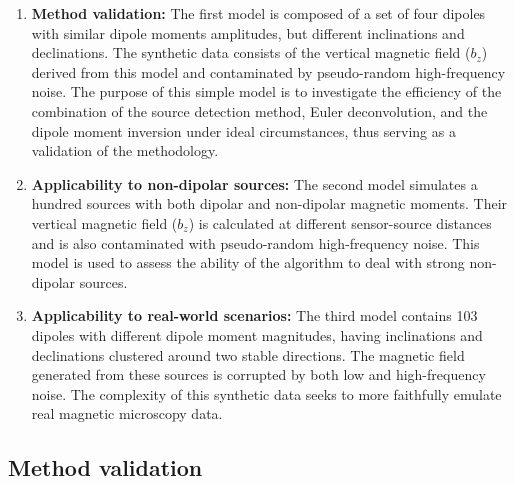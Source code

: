 \begin{enumerate}
\item \textbf{Method validation:} 
The first model is composed of a set of four dipoles with similar dipole moments amplitudes, but different inclinations and declinations.
The synthetic data consists of the vertical magnetic field ($b_z$) derived from this model and contaminated by pseudo-random high-frequency noise.
The purpose of this simple model is to investigate the efficiency of the combination of the source detection method, Euler deconvolution, and the dipole moment inversion under ideal circumstances, thus serving as a validation of the methodology.

\item \textbf{Applicability to non-dipolar sources:}
The second model simulates a hundred sources with both dipolar and non-dipolar magnetic moments.
Their vertical magnetic field ($b_z$) is calculated at different sensor-source distances
and is also contaminated with pseudo-random high-frequency noise. 
This model is used to assess the ability of the algorithm to deal with strong non-dipolar sources.

\item \textbf{Applicability to real-world scenarios:}
The third model contains 103 dipoles with different dipole moment magnitudes, having inclinations and declinations clustered around two stable directions.
The magnetic field generated from these sources is corrupted by both low and high-frequency noise.
The complexity of this synthetic data seeks to more faithfully emulate real magnetic microscopy data.
\end{enumerate}

\subsection{Method validation}

